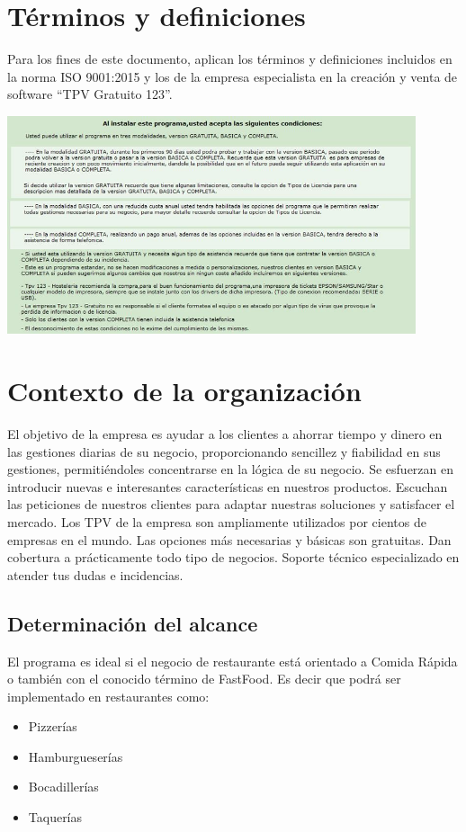 \documentclass[12pt,a4paper]{article}
\begin{document}
\section{Términos y definiciones}\textbf{}
Para los fines de este documento, aplican los términos y definiciones incluidos en la norma ISO 9001:2015 y los de la empresa especialista en la creación y venta de software “TPV Gratuito 123”.
\begin{center}
\includegraphics[width=0.9\textwidth]{segundaimagen.jpeg}   
\end{center}

\section{Contexto de la organización}\textbf{}
El objetivo de la empresa es ayudar a los clientes a ahorrar tiempo y dinero en las gestiones diarias de su negocio, proporcionando sencillez y fiabilidad en sus gestiones, permitiéndoles concentrarse en la lógica de su negocio.
Se esfuerzan en introducir nuevas e interesantes características en nuestros productos.
Escuchan las peticiones de nuestros clientes para adaptar nuestras soluciones y satisfacer el mercado.
 Los TPV de la empresa son ampliamente utilizados por cientos de empresas en el mundo.
 Las opciones más necesarias y básicas son gratuitas.
 Dan cobertura a prácticamente todo tipo de negocios.
 Soporte técnico especializado en atender tus dudas e incidencias.
 
\subsection{Determinación del alcance}
El programa es ideal si el negocio de restaurante está orientado a Comida Rápida o también con el conocido término de FastFood. Es decir que podrá ser implementado en restaurantes como:
\begin{itemize}
\item Pizzerías
\item Hamburgueserías
\item Bocadillerías
\item Taquerías\\\\
\end{itemize}
\end{document}
